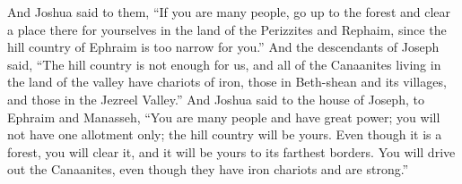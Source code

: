 \begin{biblechapter}
\verse And Joshua said to them, “If you are many people, go up to the forest and clear a place there for yourselves in the land of the Perizzites and Rephaim, since the hill country of Ephraim is too narrow for you.”
\verse And the descendants of Joseph said, “The hill country is not enough for us, and all of the Canaanites living in the land of the valley have chariots of iron, those in Beth-shean and its villages, and those in the Jezreel Valley.”
\verse And Joshua said to the house of Joseph, to Ephraim and Manasseh, “You are many people and have great power; you will not have one allotment only;
\verse the hill country will be yours. Even though it is a forest, you will clear it, and it will be yours to its farthest borders. You will drive out the Canaanites, even though they have iron chariots and are strong.”
\end{biblechapter}

